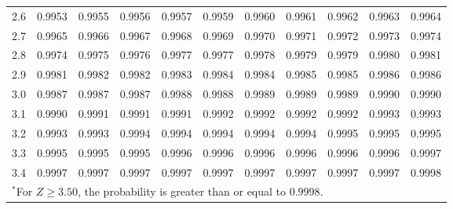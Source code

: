 \begin{table}[p]
\begin{center}
{\begin{tabular}{c | rrrrr | rrrrr |}
  2.6 & \scriptsize{0.9953} & \scriptsize{0.9955} & \scriptsize{0.9956} & \scriptsize{0.9957} & \scriptsize{0.9959} & \scriptsize{0.9960} & \scriptsize{0.9961} & \scriptsize{0.9962} & \scriptsize{0.9963} & \scriptsize{0.9964} \\
  2.7 & \scriptsize{0.9965} & \scriptsize{0.9966} & \scriptsize{0.9967} & \scriptsize{0.9968} & \scriptsize{0.9969} & \scriptsize{0.9970} & \scriptsize{0.9971} & \scriptsize{0.9972} & \scriptsize{0.9973} & \scriptsize{0.9974} \\
  2.8 & \scriptsize{0.9974} & \scriptsize{0.9975} & \scriptsize{0.9976} & \scriptsize{0.9977} & \scriptsize{0.9977} & \scriptsize{0.9978} & \scriptsize{0.9979} & \scriptsize{0.9979} & \scriptsize{0.9980} & \scriptsize{0.9981} \\
  2.9 & \scriptsize{0.9981} & \scriptsize{0.9982} & \scriptsize{0.9982} & \scriptsize{0.9983} & \scriptsize{0.9984} & \scriptsize{0.9984} & \scriptsize{0.9985} & \scriptsize{0.9985} & \scriptsize{0.9986} & \scriptsize{0.9986} \\
  \hline
  \hline
  3.0 & \scriptsize{0.9987} & \scriptsize{0.9987} & \scriptsize{0.9987} & \scriptsize{0.9988} & \scriptsize{0.9988} & \scriptsize{0.9989} & \scriptsize{0.9989} & \scriptsize{0.9989} & \scriptsize{0.9990} & \scriptsize{0.9990} \\
  3.1 & \scriptsize{0.9990} & \scriptsize{0.9991} & \scriptsize{0.9991} & \scriptsize{0.9991} & \scriptsize{0.9992} & \scriptsize{0.9992} & \scriptsize{0.9992} & \scriptsize{0.9992} & \scriptsize{0.9993} & \scriptsize{0.9993} \\
  3.2 & \scriptsize{0.9993} & \scriptsize{0.9993} & \scriptsize{0.9994} & \scriptsize{0.9994} & \scriptsize{0.9994} & \scriptsize{0.9994} & \scriptsize{0.9994} & \scriptsize{0.9995} & \scriptsize{0.9995} & \scriptsize{0.9995} \\
  3.3 & \scriptsize{0.9995} & \scriptsize{0.9995} & \scriptsize{0.9995} & \scriptsize{0.9996} & \scriptsize{0.9996} & \scriptsize{0.9996} & \scriptsize{0.9996} & \scriptsize{0.9996} & \scriptsize{0.9996} & \scriptsize{0.9997} \\
  3.4 & \scriptsize{0.9997} & \scriptsize{0.9997} & \scriptsize{0.9997} & \scriptsize{0.9997} & \scriptsize{0.9997} & \scriptsize{0.9997} & \scriptsize{0.9997} & \scriptsize{0.9997} & \scriptsize{0.9997} & \scriptsize{0.9998} \\
   \hline
\multicolumn{11}{l}{{\normalsize$^*$For $Z \geq 3.50$, the probability is greater than or equal to $0.9998$.}}
\end{tabular}}
\end{center}
\end{table}
